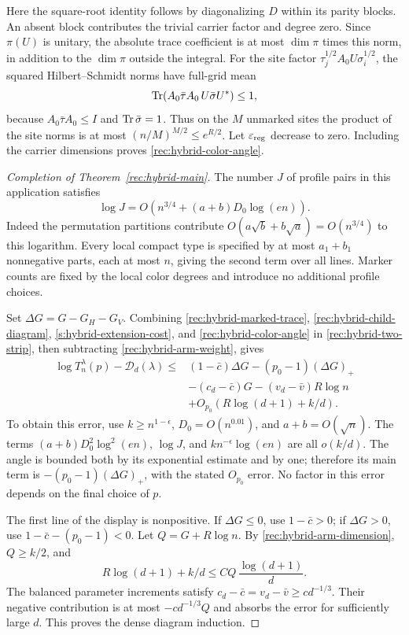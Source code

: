 Here the square-root identity follows by diagonalizing $D$ within
its parity blocks. An absent block contributes the trivial carrier
factor and degree zero. Since $\pi(U)$ is unitary, the absolute
trace coefficient is at most $\dim\pi$ times this norm, in addition
to the $\dim\pi$ outside the integral.
For the site factor $\tau_j^{1/2}A_0U\sigma_i^{1/2}$, the squared
Hilbert--Schmidt norms have full-grid mean
\[
 \operatorname{Tr}(A_0\bar\tau A_0\,U\bar\sigma U^*)\le1,
\]
because $A_0\bar\tau A_0\le I$ and $\operatorname{Tr}\bar\sigma=1$.
Thus on the $M$ unmarked sites the product of the site norms is at most
$(n/M)^{M/2}\le e^{R/2}$.  Let $\varepsilon_{\rm reg}$ decrease to zero.
Including the carrier dimensions proves
\eqref{rec:hybrid-color-angle}.

\begin{proof}[Completion of Theorem~\ref{rec:hybrid-main}]
The number $J$ of profile pairs in this application satisfies
\[
 \log J=O\!\left(n^{3/4}+(a+b)D_0\log(en)\right).
\]
Indeed the permutation partitions contribute
$O(a\sqrt b+b\sqrt a)=O(n^{3/4})$ to this logarithm. Every local
compact type is specified by at most $a_1+b_1$ nonnegative parts,
each at most $n$, giving the second term over all lines. Marker
counts are fixed by the local color degrees and introduce no
additional profile choices.

Set $\Delta G=G-G_H-G_V$. Combining
\eqref{rec:hybrid-marked-trace},
\eqref{rec:hybrid-child-diagram},
\eqref{s:hybrid-extension-cost}, and
\eqref{rec:hybrid-color-angle} in
\eqref{rec:hybrid-two-strip}, then subtracting
\eqref{rec:hybrid-arm-weight}, gives
\[
 \begin{split}
 \log T_n^\lambda(p)-\mathcal D_d(\lambda)
 \le{}&(1-\bar c)\Delta G-(p_0-1)(\Delta G)_+\\
 &-(c_d-\bar c)G-(v_d-\bar v)R\log n\\
 &+O_{p_0}\!\left(R\log(d+1)+k/d\right).
 \end{split}
\]
To obtain this error, use $k\ge n^{1-\epsilon}$,
$D_0=O(n^{0.01})$, and $a+b=O(\sqrt n)$. The terms
$(a+b)D_0^2\log^2(en)$, $\log J$, and
$kn^{-\epsilon}\log(en)$ are all $o(k/d)$.
The angle is bounded both by its exponential estimate and by one;
therefore its main term is $-(p_0-1)(\Delta G)_+$, with the stated
$O_{p_0}$ error. No factor in this error depends on the final
choice of $p$.

The first line of the display is nonpositive. If $\Delta G\le0$,
use $1-\bar c>0$; if $\Delta G>0$, use
$1-\bar c-(p_0-1)<0$.
Let $Q=G+R\log n$. By \eqref{rec:hybrid-arm-dimension},
$Q\ge k/2$, and
\[
 R\log(d+1)+k/d
 \le C Q\,\frac{\log(d+1)}d.
\]
The balanced parameter increments satisfy
$c_d-\bar c=v_d-\bar v\ge c d^{-1/3}$.
Their negative contribution is at most $-cd^{-1/3}Q$ and absorbs
the error for sufficiently large $d$. This proves the dense
diagram induction.


\end{proof}
